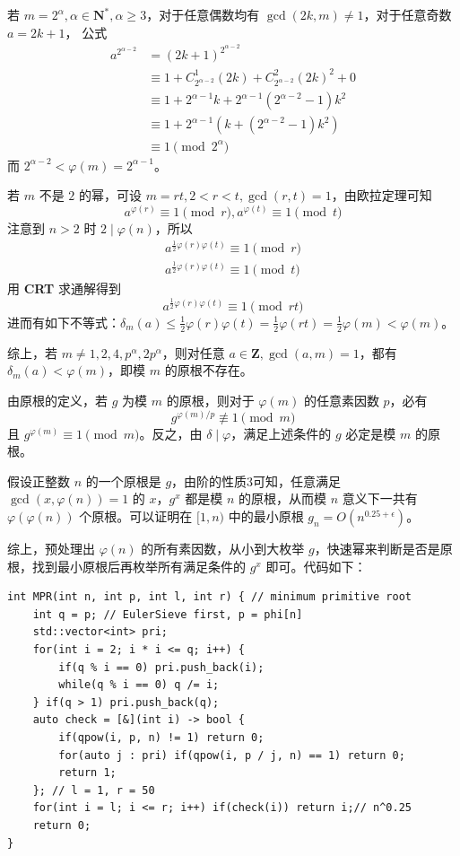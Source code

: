 \documentclass[12pt,a4paper]{article}
\begin{document}
若 $m=2^\alpha,\alpha\in\mathbf{N^*},\alpha\ge3$，对于任意偶数均有 $\gcd(2k,m)\ne1$，对于任意奇数 $a=2k+1$，
公式
\begin{align*}
	a^{2^{\alpha-2}}
	&=(2k+1)^{2^{\alpha-2}}\\
	&\equiv1+C_{2^{\alpha-2}}^1(2k)+C_{2^{\alpha-2}}^{2}(2k)^2+0\\
	&\equiv1+2^{\alpha-1}k+2^{\alpha-1}(2^{\alpha-2}-1)k^2\\
	&\equiv 1+2^{\alpha-1}(k+(2^{\alpha-2}-1)k^2)\\
	&\equiv 1 \pmod {2^{\alpha}}
\end{align*}
而 $2^{\alpha-2}<\varphi(m)=2^{\alpha-1}$。

若 $m$ 不是 $2$ 的幂，可设 $m=rt,2<r<t,\gcd(r,t)=1$，由欧拉定理可知 
\begin{equation*}
	a^{\varphi(r)}\equiv1\pmod r,a^{\varphi(t)}\equiv1\pmod t
\end{equation*}
注意到 $n>2$ 时 $2\mid\varphi(n)$，所以 
\begin{align*}
	\displaystyle a^{\frac{1}{2}\varphi(r)\varphi(t)}\equiv1\pmod{r}\\
	a^{\frac{1}{2}\varphi(r)\varphi(t)}\equiv1\pmod{t}
\end{align*}
用 \textbf{CRT} 求通解得到 
\begin{equation*}
	\displaystyle a^{\frac{1}{2}\varphi(r)\varphi(t)}\equiv1\pmod{rt}
\end{equation*}
进而有如下不等式：$\displaystyle\delta_m(a)\le\frac{1}{2}\varphi(r)\varphi(t)=\frac{1}{2}\varphi(rt)=\frac{1}{2}\varphi(m)<\varphi(m)$。

综上，若 $m\neq 1,2,4,p^\alpha,2p^\alpha$，则对任意 $a\in\mathbf{Z},\gcd(a,m)=1$，都有 $\delta_m(a)<\varphi(m)$，即模 $m$ 的原根不存在。

由原根的定义，若 $g$ 为模 $m$ 的原根，则对于 $\varphi(m)$ 的任意素因数 $p$，必有 
\begin{equation*}
	g^{\varphi(m)/p}\not\equiv1\pmod{m}
\end{equation*}
且 $g^{\varphi(m)}\equiv1\pmod m$。反之，由 $\delta\mid\varphi$，满足上述条件的 $g$ 必定是模 $m$ 的原根。

假设正整数 $n$ 的一个原根是 $g$，由阶的性质3可知，任意满足 $\gcd(x,\varphi(n))=1$ 的 $x$，$g^x$ 都是模 $n$ 的原根，从而模 $n$ 意义下一共有 $\varphi(\varphi(n))$ 个原根。可以证明在 $[1,n)$ 中的最小原根 $g_n=O(n^{0.25+\epsilon})$。

综上，预处理出 $\varphi(n)$ 的所有素因数，从小到大枚举 $g$，快速幂来判断是否是原根，找到最小原根后再枚举所有满足条件的 $g^x$ 即可。代码如下：
\begin{lstlisting}
int MPR(int n, int p, int l, int r) { // minimum primitive root
	int q = p; // EulerSieve first, p = phi[n]
	std::vector<int> pri;
	for(int i = 2; i * i <= q; i++) {
		if(q % i == 0) pri.push_back(i);
		while(q % i == 0) q /= i;
	} if(q > 1) pri.push_back(q);
	auto check = [&](int i) -> bool {
		if(qpow(i, p, n) != 1) return 0;
		for(auto j : pri) if(qpow(i, p / j, n) == 1) return 0;
		return 1;
	}; // l = 1, r = 50
	for(int i = l; i <= r; i++) if(check(i)) return i;// n^0.25
	return 0;
}
\end{lstlisting}
\end{document}
